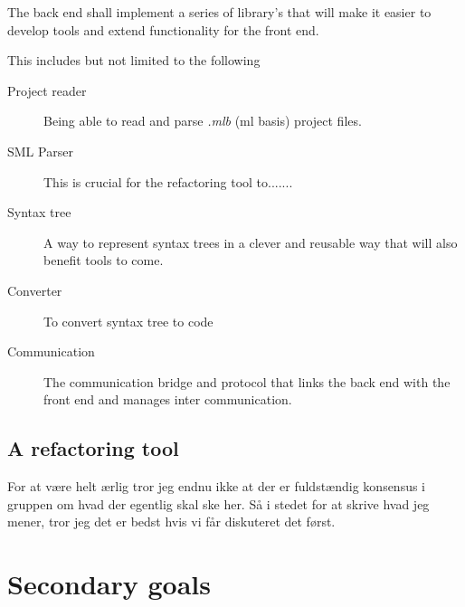 \documentclass[a4paper,oneside]{memoir}
\begin{document}
The back end shall implement a series of library's that will make it easier to
develop tools and extend functionality for the front end.

This includes but not limited to the following

\begin{description}
\item[Project reader] Being able to read and parse \textit{.mlb} (ml basis)
  project files.

\item[SML Parser] This is crucial for the refactoring tool to.......

\item[Syntax tree] A way to represent syntax trees in a clever and reusable way
  that will also benefit tools to come.

\item[Converter] To convert syntax tree to code

\item[Communication] The communication bridge and protocol that links the back
  end with the front end and manages inter communication.
\end{description}

%
%

\subsection{A refactoring tool}
\label{primary_goals:a_refactoring_tool}

For at være helt ærlig tror jeg endnu ikke at der er fuldstændig konsensus i gruppen om hvad der
egentlig skal ske her. Så i stedet for at skrive hvad jeg mener, tror jeg det er bedst hvis vi får
diskuteret det først.


\section{Secondary goals}
\end{document}
